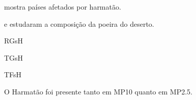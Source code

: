 \citep{kaku2016}

\citep{prospero2002} mostra países afetados por harmatão. 

\citep{engelbrecht2009a} e \citep{engelbrecht2009b} estudaram a composição 
da poeira do deserto.




\begin{table}[H]
  \centering
  \caption{RGsH}
  
\end{table}

\begin{table}[H]
  \centering
  \caption{TGsH}
  
\end{table}


\begin{table}[H]
  \centering
  \caption{TFsH}
  
\end{table}
O Harmatão foi presente tanto em MP10 quanto em MP2.5.


%
%
%
%
